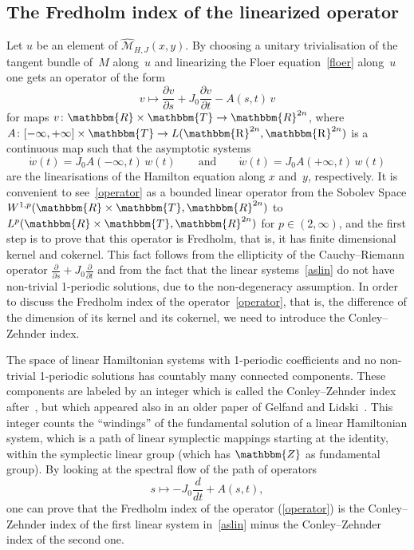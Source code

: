 \documentclass[12pt,twoside]{amsart}
\theoremstyle{plain}
\numberwithin{figure}{section}
\numberwithin{equation}{section}
\def\cm{{\mathcal M}}
\def\RR{\mathbbm{R}}
\def\TT{\mathbbm{T}}
\def\ZZ{\mathbbm{Z}}
\def\R{\operatorname{\mathbbm{R}}}
\begin{document}
\subsection{The Fredholm index of the linearized operator}  \label{s:fredholm}
Let $u$ be an element of $\widehat{\cm}_{H,J}(x,y)$. 
By choosing a unitary trivialisation of the tangent bundle of~$M$ along~$u$ and linearizing the Floer equation~\eqref{floer} along~$u$ 
one gets an operator of the form
\begin{equation}
\label{operator}
v \mapsto \frac{\partial v}{\partial s} + J_0 \frac{\partial v}{\partial t} - A(s,t)\, v
\end{equation}
for maps $v \colon \RR \times \TT \rightarrow \RR^{2n}$, where $A \colon [-\infty,+\infty] \times \TT \rightarrow L(\R^{2n},\R^{2n})$ is a continuous map such that the asymptotic systems
\begin{equation}
\label{aslin}
\dot{w}(t) = J_0 A(-\infty,t) \,w(t) \qquad \mbox{and} \qquad \dot{w}(t) = J_0 A(+\infty,t) \,w(t)
\end{equation}
are the linearisations of the Hamilton equation along $x$ and~$y$, respectively. 
It is convenient to see~\eqref{operator} as a bounded linear operator from the Sobolev Space 
$W^{1,p}(\RR\times \TT,\RR^{2n})$ to $L^p(\RR\times \TT,\RR^{2n})$ for $p \in (2,\infty)$, 
and the first step is to prove that this operator is Fredholm, that is, 
it has finite dimensional kernel and cokernel. This fact follows from the ellipticity of the Cauchy--Riemann operator $\frac{\partial}{\partial s} + J_0 \frac \partial{\partial t}$ 
and from the fact that the linear systems~\eqref{aslin} do not have non-trivial 1-periodic solutions, 
due to the non-degeneracy assumption. 
In order to discuss the Fredholm index of the operator~\eqref{operator}, that is, the difference of the dimension of its kernel and its cokernel, we need to introduce the Conley--Zehnder index.

The space of linear Hamiltonian systems with 1-periodic coefficients and no non-trivial 1-periodic solutions has countably many connected components. These components are labeled by an integer which is called 
the Conley--Zehnder index after~\cite{CoZe83,CoZe84}, 
but which appeared also in an older paper of Gelfand and Lidski~\cite{GL58}. 
This integer counts the ``windings'' of the fundamental solution of a linear Hamiltonian system, 
which is a path of linear symplectic mappings starting at the identity, 
within the symplectic linear group (which has $\ZZ$ as fundamental group). 
By looking at the spectral flow of the path of operators
\[
s \mapsto -J_0 \frac d{dt} + A(s,t) ,
\] 
one can prove that the Fredholm index of the operator (\ref{operator}) is the Conley--Zehnder index of the first linear system in~\eqref{aslin} minus the Conley--Zehnder index of the second one.
\end{document}
